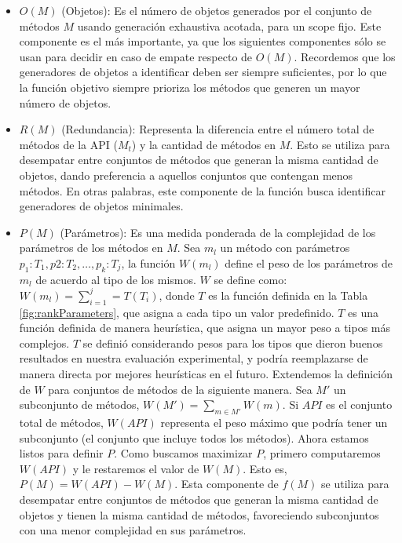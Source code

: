 \begin{itemize}
    \item $O(M)$ (Objetos): Es el número de objetos generados por el conjunto de métodos $M$ usando generación exhaustiva acotada, para un scope fijo. Este componente es el más importante, ya que los siguientes componentes sólo se usan para decidir en caso de empate respecto de $O(M)$. Recordemos que los generadores de objetos a identificar deben ser siempre suficientes, por lo que la función objetivo siempre prioriza los métodos que generen un mayor número de objetos.
    \item $R(M)$ (Redundancia): Representa la diferencia entre el número total de métodos de la API ($M_t$) y la cantidad de métodos en $M$. Esto se utiliza para desempatar entre conjuntos de métodos que generan la misma cantidad de objetos, dando preferencia a aquellos conjuntos que contengan menos métodos. En otras palabras, este componente de la función busca identificar generadores de objetos minimales.
    \item $P(M)$ (Parámetros): Es una medida ponderada de la complejidad de los
        parámetros de los métodos en $M$. Sea $m_l$ un método con parámetros $p_1: T_1,
            p2: T_2, \ldots, p_k: T_j$, la función $W(m_l)$ define el peso de los
            parámetros de $m_l$ de acuerdo al tipo de los mismos. $W$ se
            define como: $W(m_l) = \sum_{i=1}^j = T(T_i)$, donde $T$ es la función
            definida en la Tabla \ref{fig:rankParameters}, que asigna a cada
            tipo un valor predefinido. $T$ es una función definida de manera heurística, 
            que asigna un mayor peso a tipos más complejos. $T$ se definió 
            considerando pesos para los tipos que dieron buenos resultados en
            nuestra evaluación experimental, y podría reemplazarse de manera
            directa por mejores heurísticas en el futuro. Extendemos la
            definición de $W$ para conjuntos de métodos de la siguiente manera.
            Sea $M'$ un subconjunto de métodos, $W(M') = \sum_{m \in M'} W(m)$.
            Si $API$ es el conjunto total de métodos, $W(API)$ representa
            el peso máximo que podría tener un subconjunto (el conjunto que
            incluye todos los métodos). 
            Ahora estamos listos para definir $P$. Como buscamos maximizar $P$, 
            primero computaremos $W(API)$ y le restaremos el valor de $W(M)$. 
            Esto es, $P(M) = W(API) - W(M)$. Esta componente de $f(M)$ se
            utiliza para desempatar entre conjuntos de métodos que generan la
            misma cantidad de objetos y tienen la misma cantidad de métodos,
            favoreciendo subconjuntos con una menor complejidad en sus
        parámetros.


\end{itemize}


